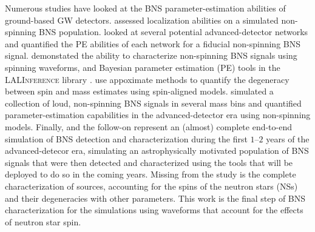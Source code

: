 Numerous studies have looked at the BNS parameter-estimation abilities of ground-based GW detectors. \citet{Nissanke_2010,Nissanke_2011} assessed localization abilities on a simulated non-spinning BNS population.  \citet{Veitch_2012} looked at several potential advanced-detector networks and quantified the PE abilities of each network for a fiducial non-spinning BNS signal.  \citet{Aasi_2013} demonstated the ability to characterize non-spinning BNS signals using spinning waveforms, and Bayesian parameter estimation (PE) tools in the \textsc{LALInference} library \cite{Veitch_2014}.   \citet{Hannam_2013} use appoximate methods to quantify the degeneracy between spin and mass estimates using spin-aligned models.  \citet{Rodriguez_2014} simulated a collection of loud, non-spinning BNS signals in several mass bins and quantified parameter-estimation capabilities in the advanced-detector era using non-spinning models.  Finally, \citet{Singer_2014} and the follow-on \citet{Berry_2014} represent an (almost) complete end-to-end simulation of BNS detection and characterization during the first $1$--$2$ years of the advanced-detecor era, simulating an astrophysically motivated population of BNS signals that were then detected and characterized using the tools that will be deployed to do so in the coming years.   Missing from the \citet{Singer_2014} study is the complete characterization of sources, accounting for the spins of the neutron stars (NSs) and their degeneracies with other parameters.  This work is the final step of BNS characterization for the \citet{Singer_2014} simulations using waveforms that account for the effects of neutron star spin.